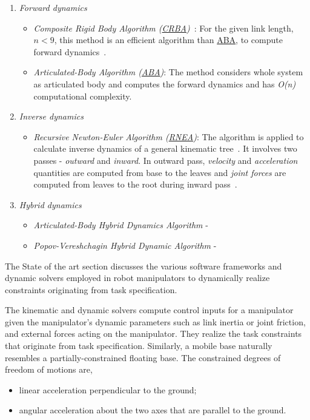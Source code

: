 \begin{enumerate}
	\item \textit{Forward dynamics}
	\begin{itemize}
		\item \textit{Composite Rigid Body Algorithm (\hyperref[crba]{CRBA})}~\cite{walker1982efficient}: For the given link length, $n < 9$, this method is an efficient algorithm than \hyperref[aba]{ABA}, to compute forward dynamics~\cite{featherstone2000robot}. 
		\item  \textit{Articulated-Body Algorithm (\hyperref[aba]{ABA})}: The method considers whole system as articulated body and computes the forward dynamics and has \textit{O(n)} computational complexity.
	\end{itemize}
	\item \textit{Inverse dynamics}
	\begin{itemize}
		\item \textit{Recursive Newton-Euler Algorithm (\hyperref[rnea]{RNEA})}: The algorithm is applied to calculate inverse dynamics of a general kinematic tree~\cite{featherstone2000robot}. It involves two passes - \textit{outward} and \textit{inward}. In outward pass, \textit{velocity} and \textit{acceleration} quantities are computed from base to the leaves and \textit{joint forces} are computed from leaves to the root during inward pass~\cite{featherstone2014rigid}. 
	\end{itemize}
	\item \textit{Hybrid dynamics}
	\begin{itemize}
		\item \textit{Articulated-Body Hybrid Dynamics Algorithm} - 
		\item \textit{Popov-Vereshchagin Hybrid Dynamic Algorithm} - 
	\end{itemize}
	
	
\end{enumerate}
 
The State of the art section discusses the various software frameworks and dynamic solvers employed in robot manipulators to dynamically realize constraints originating from task specification. 

The kinematic and dynamic solvers compute control inputs for a manipulator given the manipulator’s dynamic parameters such as link inertia or joint friction, and external forces acting on the manipulator. They realize the task constraints that originate from task specification. Similarly, a mobile base naturally resembles a partially-constrained floating base. The constrained degrees of freedom of motions are,
\begin{itemize}
	\item linear acceleration perpendicular to the ground;
	\item angular acceleration about the two axes that are parallel to the ground.
\end{itemize}

